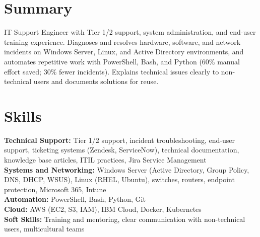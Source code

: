 \documentclass[a4paper,10pt]{article}
\begin{document}

\section*{Summary}
IT Support Engineer with Tier 1/2 support, system administration, and end-user training experience. Diagnoses and resolves hardware, software, and network incidents on Windows Server, Linux, and Active Directory environments, and automates repetitive work with PowerShell, Bash, and Python (60\% manual effort saved; 30\% fewer incidents). Explains technical issues clearly to non-technical users and documents solutions for reuse.

\section*{Skills}
\textbf{Technical Support:} Tier 1/2 support, incident troubleshooting, end-user support, ticketing systems (Zendesk, ServiceNow), technical documentation, knowledge base articles, ITIL practices, Jira Service Management \\
\textbf{Systems and Networking:} Windows Server (Active Directory, Group Policy, DNS, DHCP, WSUS), Linux (RHEL, Ubuntu), switches, routers, endpoint protection, Microsoft 365, Intune \\
\textbf{Automation:} PowerShell, Bash, Python, Git\\
\textbf{Cloud:} AWS (EC2, S3, IAM), IBM Cloud, Docker, Kubernetes\\
\textbf{Soft Skills:} Training and mentoring, clear communication with non-technical users, multicultural teams
\end{document}
